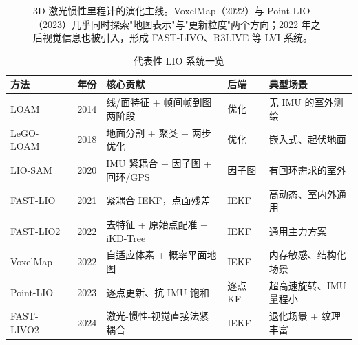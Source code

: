 \begin{figure}[htbp]
  \centering
  \caption{3D 激光惯性里程计的演化主线。VoxelMap（2022）与 Point-LIO（2023）几乎同时探索"地图表示"与"更新粒度"两个方向；2022 年之后视觉信息也被引入，形成 FAST-LIVO、R3LIVE 等 LVI 系统。}\label{fig:16-timeline}
\end{figure}

\begin{table}[htbp]
  \centering
  \caption{代表性 LIO 系统一览}\label{tab:16-milestones}
  \footnotesize
  \begin{tabular}{lllll}
    \toprule
    方法 & 年份 & 核心贡献 & 后端 & 典型场景 \\
    \midrule
    LOAM~\cite{zhang2014loam} & 2014 & 线/面特征 + 帧间帧到图两阶段 & 优化 & 无 IMU 的室外测绘 \\
    LeGO-LOAM~\cite{shan2018lego} & 2018 & 地面分割 + 聚类 + 两步优化 & 优化 & 嵌入式、起伏地面 \\
    LIO-SAM~\cite{shan2020liosam} & 2020 & IMU 紧耦合 + 因子图 + 回环/GPS & 因子图 & 有回环需求的室外 \\
    FAST-LIO~\cite{xu2021fastlio} & 2021 & 紧耦合 IEKF，点面残差 & IEKF & 高动态、室内外通用 \\
    FAST-LIO2~\cite{xu2022fastlio2} & 2022 & 去特征 + 原始点配准 + iKD-Tree & IEKF & 通用主力方案 \\
    VoxelMap~\cite{yuan2022voxelmap} & 2022 & 自适应体素 + 概率平面地图 & IEKF & 内存敏感、结构化场景 \\
    Point-LIO~\cite{he2023pointlio} & 2023 & 逐点更新、抗 IMU 饱和 & 逐点 KF & 超高速旋转、IMU 量程小 \\
    FAST-LIVO2~\cite{yuan2024fastlivo2} & 2024 & 激光-惯性-视觉直接法紧耦合 & IEKF & 退化场景 + 纹理丰富 \\
    \bottomrule
  \end{tabular}
\end{table}

